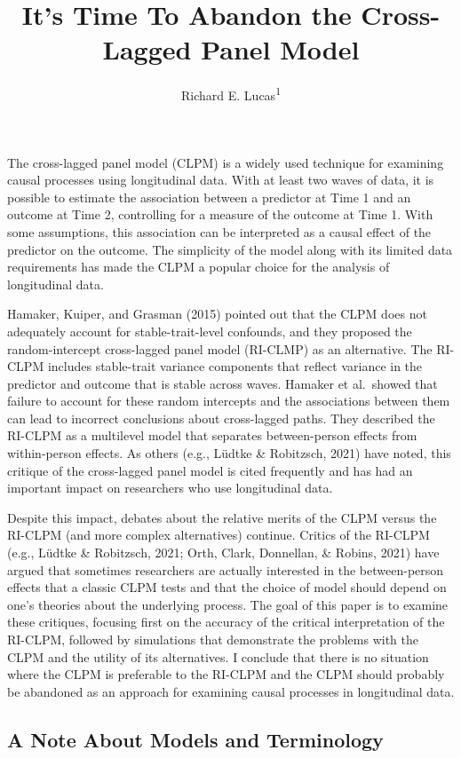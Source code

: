 \documentclass[
  english,
  man,floatsintext]{apa6}
\title{It's Time To Abandon the Cross-Lagged Panel Model}
\author{Richard E. Lucas\textsuperscript{1}}
\date{}
\affiliation{\vspace{0.5cm}\textsuperscript{1} Department of Psychology, Michigan State University}
\begin{document}
\maketitle

The cross-lagged panel model (CLPM) is a widely used technique for examining causal processes using longitudinal data. With at least two waves of data, it is possible to estimate the association between a predictor at Time 1 and an outcome at Time 2, controlling for a measure of the outcome at Time 1. With some assumptions, this association can be interpreted as a causal effect of the predictor on the outcome. The simplicity of the model along with its limited data requirements has made the CLPM a popular choice for the analysis of longitudinal data.

Hamaker, Kuiper, and Grasman (2015) pointed out that the CLPM does not adequately account for stable-trait-level confounds, and they proposed the random-intercept cross-lagged panel model (RI-CLMP) as an alternative. The RI-CLPM includes stable-trait variance components that reflect variance in the predictor and outcome that is stable across waves. Hamaker et al.~showed that failure to account for these random intercepts and the associations between them can lead to incorrect conclusions about cross-lagged paths. They described the RI-CLPM as a multilevel model that separates between-person effects from within-person effects. As others (e.g., Lüdtke \& Robitzsch, 2021) have noted, this critique of the cross-lagged panel model is cited frequently and has had an important impact on researchers who use longitudinal data.

Despite this impact, debates about the relative merits of the CLPM versus the RI-CLPM (and more complex alternatives) continue. Critics of the RI-CLPM (e.g., Lüdtke \& Robitzsch, 2021; Orth, Clark, Donnellan, \& Robins, 2021) have argued that sometimes researchers are actually interested in the between-person effects that a classic CLPM tests and that the choice of model should depend on one's theories about the underlying process. The goal of this paper is to examine these critiques, focusing first on the accuracy of the critical interpretation of the RI-CLPM, followed by simulations that demonstrate the problems with the CLPM and the utility of its alternatives. I conclude that there is no situation where the CLPM is preferable to the RI-CLPM and the CLPM should probably be abandoned as an approach for examining causal processes in longitudinal data.

\hypertarget{a-note-about-models-and-terminology}{%
\subsection{A Note About Models and Terminology}\label{a-note-about-models-and-terminology}}
\end{document}
